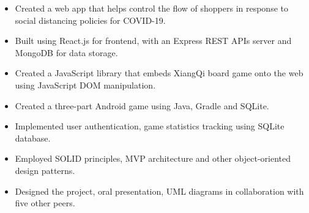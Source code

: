 


\vspace{5pt}

\begin{itemize}
	\item Created a web app that helps control the flow of shoppers in response to social distancing policies for COVID-19.
	\item Built using React.js for frontend, with an Express REST APIs server and MongoDB for data storage.
\end{itemize}

\divider


\vspace{5pt}

\begin{itemize}
	\item Created a JavaScript library that embeds XiangQi board game onto the web using JavaScript DOM manipulation.
\end{itemize}

\divider


\vspace{5pt}

\begin{itemize}
	\item Created a three-part Android game using Java, Gradle and SQLite.
    \item Implemented user authentication, game statistics tracking using SQLite database.
    \item Employed SOLID principles, MVP architecture and other object-oriented design patterns.
	\item Designed the project, oral presentation, UML diagrams in collaboration with five other peers.
\end{itemize}

\divider


